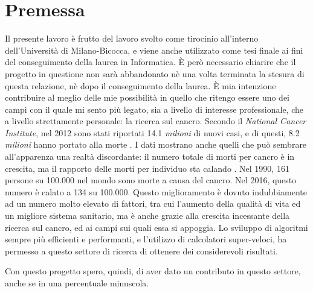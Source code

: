\newpage
\cleardoublepage
\begingroup
\let\clearpage\endgroup
\null{}
\chapter*{\centering Premessa}

Il presente lavoro è frutto del lavoro svolto come tirocinio all'interno dell'Università di Milano-Bicocca, e viene anche utilizzato come tesi finale ai fini del conseguimento della laurea in Informatica. È però necessario chiarire che il progetto in questione non sarà abbandonato nè una volta terminata la stesura di questa relazione, nè dopo il conseguimento della laurea. È mia intenzione contribuire al meglio delle mie possibilità in quello che ritengo essere uno dei campi con il quale mi sento più legato, sia a livello di interesse professionale, che a livello strettamente personale: la ricerca sul cancro. Secondo il \textit{National Cancer Institute}, nel 2012 sono stati riportati 14.1 \textit{milioni} di nuovi casi, e di questi, 8.2 \textit{milioni} hanno portato alla morte \cite{cancerstats}. I dati mostrano anche quelli che può sembrare all'apparenza una realtà discordante: il numero totale di morti per cancro è in crescita, ma il rapporto delle morti per individuo sta calando \cite{worldindatacancer}. Nel 1990, 161 persone su 100.000 nel mondo sono morte a causa del cancro. Nel 2016, questo numero è calato a 134 su 100.000. Questo miglioramento è dovuto indubbiamente ad un numero molto elevato di fattori, tra cui l'aumento della qualità di vita ed un migliore sistema sanitario, ma è anche grazie alla crescita incessante della ricerca sul cancro, ed ai campi sui quali essa si appoggia. Lo sviluppo di algoritmi sempre più efficienti e performanti, e l'utilizzo di calcolatori super-veloci, ha permesso a questo settore di ricerca di ottenere dei considerevoli risultati.

Con questo progetto spero, quindi, di aver dato un contributo in questo settore, anche se in una percentuale minuscola.

 \null

\newpage
\cleardoublepage
\begingroup
\let\clearpage\endgroup
\null{}
